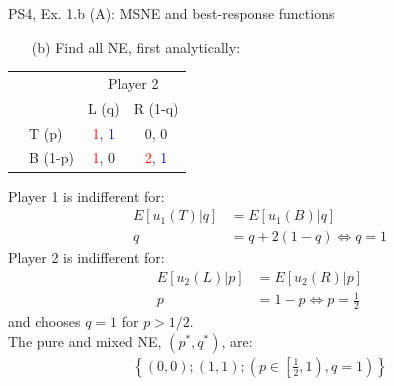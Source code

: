 \begin{frame}{PS4, Ex. 1.b (A): MSNE and best-response functions}
  \begin{multicols}{2}
    \begin{itemize}
      \item[(b)] Find all NE, first analytically:
    \end{itemize}
    \begin{table}
      \begin{tabular}{cl|c|c|}
        & \multicolumn{1}{c}{} & \multicolumn{2}{c}{\color{blue}Player 2}\\
        \parbox[t]{1mm}{}
        &  &  &  \\
        & T (p) & \textcolor{red}{1}, \textcolor{blue}{1} & 0, 0 \\
        & B (1-p) & \textcolor{red}{1}, 0 & \textcolor{red}{2}, \textcolor{blue}{1} \\
      \end{tabular}
    \end{table}
    Player 1 is indifferent for:
    \begin{align*}
      E[u_1(T)|q]&=E[u_1(B)|q]\\
      q &= q + 2(1-q) \Leftrightarrow q = 1
    \end{align*}
    Player 2 is indifferent for:
    \begin{align*}
      E[u_2(L)|p]&=E[u_2(R)|p]\\
      p &= 1-p \Leftrightarrow p = \frac{1}{2}
    \end{align*}
    and chooses $q=1$ for $p>1/2$.\\\medskip
    The pure and mixed NE, $(p^{*},q^{*})$, are:
    \begin{align*}
      \left\{(0,0);(1,1);\left(p\in\left[\frac{1}{2},1\right),q=1\right)\right\}
    \end{align*}
  \vfill\null \columnbreak
  \vfill\null
  \end{multicols}
\end{frame}
